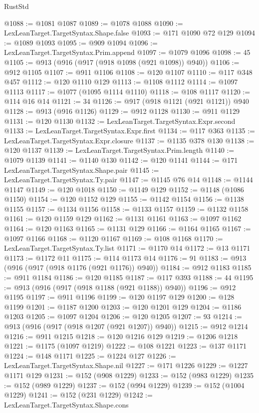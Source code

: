 \begin{lexlean}{RustStd}
\begin{coremodule}
@1088 := @1081 @1087
@1089 := @1078 @1088
@1090 := LexLeanTarget.TargetSyntax.Shape.false
@1093 := @171 @1090 @72 @129
@1094 := @1089 @1093
@1095 := @909 @1094
@1096 := LexLeanTarget.TargetSyntax.Prim.append
@1097 := @1079 @1096
@1098 := 45
@1105 := @913 (@916 (@917 (@918 @1098 (@921 @1098)) @940))
@1106 := @912 @1105
@1107 := @911 @1106
@1108 := @120 @1107
@1110 := @117 @348 @457
@1112 := @120 @1110 @129
@1113 := @1108 @1112
@1114 := @1097 @1113
@1117 := @1077 (@1095 @1114 @1110)
@1118 := @108 @1117
@1120 := @114 @16 @14
@1121 := 34
@1126 := @917 (@918 @1121 (@921 @1121)) @940
@1128 := @913 (@916 @1126)
@1129 := @912 @1128
@1130 := @911 @1129
@1131 := @120 @1130
@1132 := LexLeanTarget.TargetSyntax.Expr.second
@1133 := LexLeanTarget.TargetSyntax.Expr.first
@1134 := @117 @363
@1135 := LexLeanTarget.TargetSyntax.Expr.closure
@1137 := @1135 @378 @130
@1138 := @120 @1137
@1139 := LexLeanTarget.TargetSyntax.Prim.length
@1140 := @1079 @1139
@1141 := @1140 @130
@1142 := @120 @1141
@1144 := @171 LexLeanTarget.TargetSyntax.Shape.pair
@1145 := LexLeanTarget.TargetSyntax.Ty.pair
@1147 := @1145 @76 @14
@1148 := @1144 @1147
@1149 := @120 @1018
@1150 := @1149 @129
@1152 := @1148 (@1086 @1150)
@1154 := @120 @1152 @129
@1155 := @1142 @1154
@1156 := @1138 @1155
@1157 := @1134 @1156
@1158 := @1133 @1157
@1159 := @1132 @1158
@1161 := @120 @1159 @129
@1162 := @1131 @1161
@1163 := @1097 @1162
@1164 := @120 @1163
@1165 := @1131 @129
@1166 := @1164 @1165
@1167 := @1097 @1166
@1168 := @1120 @1167
@1169 := @108 @1168
@1170 := LexLeanTarget.TargetSyntax.Ty.list
@1171 := @1170 @14
@1172 := @13 @1171
@1173 := @1172 @11
@1175 := @114 @1173 @14
@1176 := 91
@1183 := @913 (@916 (@917 (@918 @1176 (@921 @1176)) @940))
@1184 := @912 @1183
@1185 := @911 @1184
@1186 := @120 @1185
@1187 := @117 @393
@1188 := 44
@1195 := @913 (@916 (@917 (@918 @1188 (@921 @1188)) @940))
@1196 := @912 @1195
@1197 := @911 @1196
@1199 := @120 @1197 @129
@1200 := @128 @1199
@1201 := @1187 @1200
@1203 := @120 @1201 @129
@1204 := @1186 @1203
@1205 := @1097 @1204
@1206 := @120 @1205
@1207 := 93
@1214 := @913 (@916 (@917 (@918 @1207 (@921 @1207)) @940))
@1215 := @912 @1214
@1216 := @911 @1215
@1218 := @120 @1216 @129
@1219 := @1206 @1218
@1221 := @1175 (@1097 @1219)
@1222 := @108 @1221
@1223 := @137 @1171
@1224 := @148 @1171
@1225 := @1224 @127
@1226 := LexLeanTarget.TargetSyntax.Shape.nil
@1227 := @171 @1226
@1229 := @1227 @1171 @129
@1231 := @152 (@908 @1229)
@1233 := @152 (@983 @1229)
@1235 := @152 (@989 @1229)
@1237 := @152 (@994 @1229)
@1239 := @152 (@1004 @1229)
@1241 := @152 (@231 @1229)
@1242 := LexLeanTarget.TargetSyntax.Shape.cons

\end{coremodule}
\end{lexlean}
